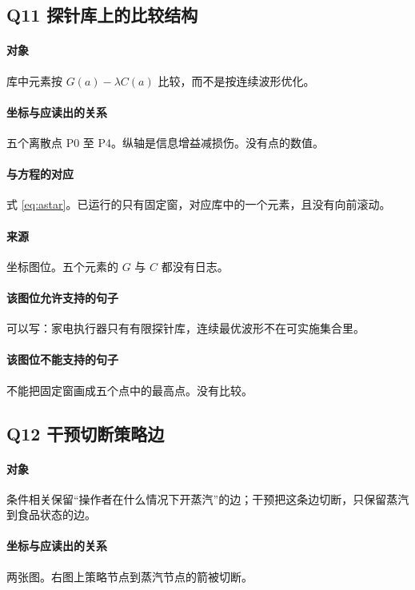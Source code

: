 \subsection{Q11 探针库上的比较结构}
\paragraph{对象}
库中元素按 $G(a)-\lambda C(a)$ 比较，而不是按连续波形优化。

\paragraph{坐标与应读出的关系}
五个离散点 P0 至 P4。纵轴是信息增益减损伤。没有点的数值。

\paragraph{与方程的对应}
式 \eqref{eq:astar}。已运行的只有固定窗，对应库中的一个元素，且没有向前滚动。

\paragraph{来源}
坐标图位。五个元素的 $G$ 与 $C$ 都没有日志。

\paragraph{该图位允许支持的句子}
可以写：家电执行器只有有限探针库，连续最优波形不在可实施集合里。

\paragraph{该图位不能支持的句子}
不能把固定窗画成五个点中的最高点。没有比较。

\subsection{Q12 干预切断策略边}
\paragraph{对象}
条件相关保留“操作者在什么情况下开蒸汽”的边；干预把这条边切断，只保留蒸汽到食品状态的边。

\paragraph{坐标与应读出的关系}
两张图。右图上策略节点到蒸汽节点的箭被切断。

